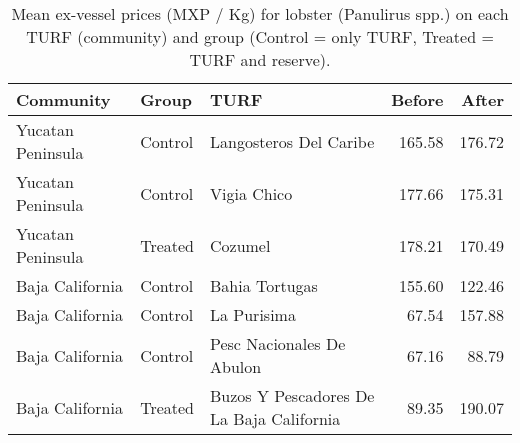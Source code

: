 \begin{table}[t]

\caption{\label{tab:}Mean ex-vessel prices (MXP / Kg) for lobster (Panulirus spp.) on each TURF (community) and group (Control = only TURF, Treated = TURF and reserve).}
\centering
\begin{tabular}{lllrr}
\toprule
Community & Group & TURF & Before & After\\
\midrule
Yucatan Peninsula & Control & Langosteros Del Caribe & 165.58 & 176.72\\
Yucatan Peninsula & Control & Vigia Chico & 177.66 & 175.31\\
Yucatan Peninsula & Treated & Cozumel & 178.21 & 170.49\\
Baja California & Control & Bahia Tortugas & 155.60 & 122.46\\
Baja California & Control & La Purisima & 67.54 & 157.88\\
\addlinespace
Baja California & Control & Pesc Nacionales De Abulon & 67.16 & 88.79\\
Baja California & Treated & Buzos Y Pescadores De La Baja California & 89.35 & 190.07\\
\bottomrule
\end{tabular}
\end{table}